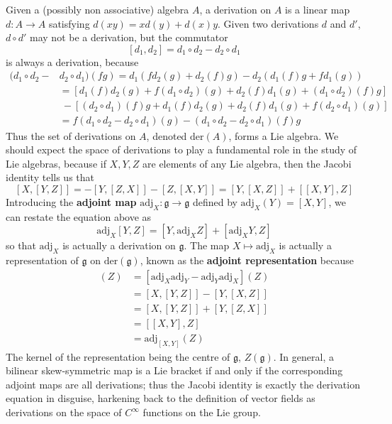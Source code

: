 \begin{example}
    Given a (possibly non associative) algebra $A$, a derivation on $A$ is a linear map $d: A \to A$ satisfying $d(xy) = xd(y) + d(x)y$. Given two derivations $d$ and $d'$, $d \circ d'$ may not be a derivation, but the commutator
    \[ [d_1, d_2] = d_1 \circ d_2 - d_2 \circ d_1 \]
    is always a derivation, because
    \begin{align*}
        (d_1 \circ d_2 - &d_2 \circ d_1)(fg) = d_1(f d_2(g) + d_2(f) g) - d_2(d_1(f) g + f d_1(g))\\
        &= [d_1(f) d_2(g) + f (d_1 \circ d_2)(g) + d_2(f) d_1(g) + (d_1 \circ d_2)(f) g]\\
        &\ - [(d_2 \circ d_1)(f) g + d_1(f) d_2(g) + d_2(f) d_1(g) + f (d_2 \circ d_1)(g)]\\
        &= f(d_1 \circ d_2 - d_2 \circ d_1)(g) - (d_1 \circ d_2 - d_2 \circ d_1)(f) g
    \end{align*}
    Thus the set of derivations on $A$, denoted $\text{der}(A)$, forms a Lie algebra. We should expect the space of derivations to play a fundamental role in the study of Lie algebras, because if $X,Y,Z$ are elements of any Lie algebra, then the Jacobi identity tells us that
    \[ [X,[Y,Z]] = - [Y,[Z,X]] - [Z,[X,Y]] = [Y,[X,Z]] + [[X,Y],Z] \]
    Introducing the {\bf adjoint map} $\text{adj}_X: \mathfrak{g} \to \mathfrak{g}$ defined by $\text{adj}_X(Y) = [X,Y]$, we can restate the equation above as
    \[ \text{adj}_X[Y,Z] = [Y, \text{adj}_X Z] + [\text{adj}_XY, Z] \]
    so that $\text{adj}_X$ is actually a derivation on $\mathfrak{g}$. The map $X \mapsto \text{adj}_X$ is actually a representation of $\mathfrak{g}$ on $\text{der}(\mathfrak{g})$, known as the {\bf adjoint representation} because
    \begin{align*}
        [\text{adj}_X, \text{adj}_Y](Z) &= [\text{adj}_X \text{adj}_Y - \text{adj}_Y \text{adj}_X](Z)\\
        &= [X,[Y,Z]] - [Y,[X,Z]]\\
        &= [X,[Y,Z]] + [Y,[Z,X]]\\
        &= [[X,Y],Z]\\
        &= \text{adj}_{[X,Y]}(Z)
    \end{align*}
    The kernel of the representation being the centre of $\mathfrak{g}$, $Z(\mathfrak{g})$. In general, a bilinear skew-symmetric map is a Lie bracket if and only if the corresponding adjoint maps are all derivations; thus the Jacobi identity is exactly the derivation equation in disguise, harkening back to the definition of vector fields as derivations on the space of $C^\infty$ functions on the Lie group.
\end{example}

